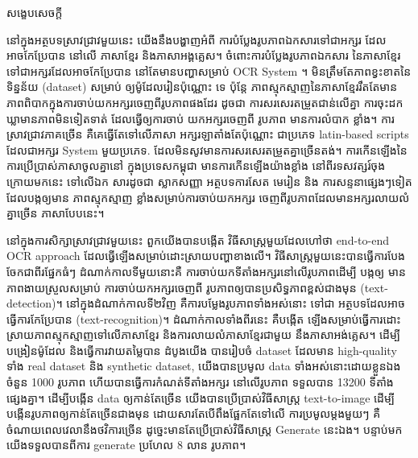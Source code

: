 \begin{adjustwidth}{0.2cm}{0.2cm}

    \begin{center}
        {\khmerfont\fontsize{15pt}{25pt}\selectfont សង្ខេបសេចក្ដី \par}
    \end{center}
    \label{khmer-abstract}
    \vspace{0.5cm}
    \khmernormal
    \small
    នៅក្នុងអត្ថបទស្រាវជ្រាវមួយនេះ យើងនឹងបង្ហាញអំពី ការបំប្លែងរូបភាពឯកសារទៅជាអក្សរ 
    ដែលអាចកែប្រែបាន នៅលើ ភាសាខ្មែរ និងភាសាអង្គគ្លេស។ ចំពោះការបំប្លែងរូបភាពឯកសារ 
    នៃភាសាខ្មែរ ទៅជាអក្សរដែលអាចកែប្រែបាន នៅតែមានបញ្ហាសម្រាប់ OCR System ។ 
    មិនត្រឹមតែភាពខ្វះខាតនៃ ទិន្នន័យ (dataset) សម្រាប់ ឲ្យម៉ូដែលរៀនប៉ុណ្ណោះ ទេ ប៉ុន្តែ 
    ភាពស្មុកស្មាញនៃភាសាខ្មែររឹតតែមានភាពពិបាកក្នុងការចាប់យកអក្សរចេញពីរូបភាពផងដែរ 
    ដូចជា ការសរសេរតម្រួតជាន់លើគ្នា ការចុះដកឃ្លាមានភាពមិនទៀតទាត់ ដែលធ្វើឲ្យការចាប់ 
    យកអក្សរចេញពី រូបភាព មានការលំបាក ខ្លាំង។ ការស្រាវជ្រាវភាគច្រើន គឺគេធ្វើតែទៅលើភាសា 
    អក្សរឡាតាំងតែប៉ុណ្ណោះ ជាប្រភេទ latin-based scripts ដែលជាអក្សរ System មួយប្រភេទ. 
    ដែលមិនសូវមានការសរសេរតម្រួតគ្នាច្រើនតង់។ ការកើនឡើងនៃការប្រើប្រាស់ភាសាចូលគ្នានៅ
    ក្នុងប្រទេសកម្ពុជា មានការកើនឡើងយ៉ាងខ្លាំង នៅពីរទសវត្សរ៍ចុងក្រោយមកនេះ ទៅលើឯក
    សារដូចជា ស្លាកសញ្ញា អត្ថបទការសែត មេរៀន និង ការសន្ទនាផ្សេងៗទៀតដែលបង្កឲ្យមាន
    ភាពស្មុកស្មាញ ខ្លាំងសម្រាប់ការចាប់យកអក្សរ ចេញពីរូបភាពដែលមានអក្សរលាយលំគ្នាច្រើន
    ភាសាបែបនេះ។

    នៅក្នុងការសិក្សាស្រាវជ្រាវមួយនេះ ពួកយើងបានបង្កើត វិធីសាស្ដ្រមួយដែលហៅថា end-to-end 
    OCR approach ដែលធ្វើឡើងសម្រាប់ដោះស្រាយបញ្ហាខាងលើ។ វិធីសាស្ដ្រមួយនេះបានធ្វើការបែង
    ចែកជាពីរផ្នែកធំៗ ដំណាក់កាលទីមួយនោះគឺ ការចាប់យកទីតាំងអក្សរនៅលើរូបភាពដើម្បី បង្កឲ្យ
    មានភាពងាយស្រួលសម្រាប់ ការចាប់យកអក្សរចេញពី រូបភាពឲ្យបានប្រសិទ្ធភាពខ្ពស់ជាងមុន 
    (text-detection)។ នៅក្នុងដំណាក់កាលទី២វិញ គឺការបម្លែងរូបភាពទាំងអស់នោះ ទៅជា
    អត្ថបទដែលអាចធ្វើការកែប្រែបាន (text-recognition)។ ដំណាក់កាលទាំងពីរនេះ គឺបង្កើត
    ឡើងសម្រាប់ធ្វើការដោះស្រាយភាពស្មុកស្មាញទៅលើភាសាខ្មែរ និងការលាយលំភាសាខ្មែរជាមួយ
    នឹងភាសាអង់គ្លេស។
    ដើម្បីបង្រៀនម៉ូដែល និងធ្វើការវាយតម្លៃបាន ដំបូងយើង បានរៀបចំ dataset ដែលមាន 
    high-quality ទាំង real dataset និង synthetic dataset, យើងបានប្រមូល 
    data ទាំងអស់នោះដោយខ្លួនឯង ចំនួន 1000 រូបភាព ហើយបានធ្វើការកំណត់ទីតាំងអក្សរ
    នៅលើរូបភាព ទទួលបាន 13200 ទីតាំងផ្សេងគ្នា។
    ដើម្បីបង្កើន data ឲ្យកាន់តែច្រើន យើងបានប្រើប្រាស់វិធីសាស្ដ្រ text-to-image ដើម្បី
    បង្កើនរូបភាពឲ្យកាន់តែច្រើនជាងមុន ដោយសារតែបើពឹងផ្អែកតែទៅលើ ការប្រមូលម្ដងមួយៗ
    គឺចំណាយពេលវេលានឹងថវិការច្រើន ដូច្នេះមានតែប្រើប្រាស់វិធីសាស្ដ្រ Generate នេះឯង។ 
    បន្ទាប់មកយើងទទួលបានពីការ generate ប្រហែល 8 លាន រូបភាព។


\end{adjustwidth}
